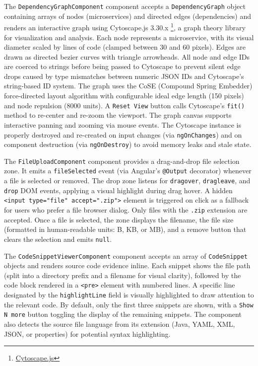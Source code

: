 \par The \texttt{DependencyGraphComponent} component accepts a \texttt{DependencyGraph} object containing arrays of nodes (microservices) and directed edges (dependencies) and renders an interactive graph using Cytoscape.js 3.30.x \footnote{\href{https://cytoscape.org/index.html}{Cytoscape.js}}, a graph theory library for visualization and analysis. Each node represents a microservice, with its visual diameter scaled by lines of code (clamped between 30 and 60 pixels). Edges are drawn as directed bezier curves with triangle arrowheads. All node and edge IDs are coerced to strings before being passed to Cytoscape to prevent silent edge drops caused by type mismatches between numeric JSON IDs and Cytoscape's string-based ID system. The graph uses the CoSE (Compound Spring Embedder) force-directed layout algorithm with configurable ideal edge length (150 pixels) and node repulsion (8000 units). A \texttt{Reset View} button calls Cytoscape's \texttt{fit()} method to re-center and re-zoom the viewport. The graph canvas supports interactive panning and zooming via mouse events. The Cytoscape instance is properly destroyed and re-created on input changes (via \texttt{ngOnChanges}) and on component destruction (via \texttt{ngOnDestroy}) to avoid memory leaks and stale state.

\par The \texttt{FileUploadComponent} component provides a drag-and-drop file selection zone. It emits a \texttt{fileSelected} event (via Angular's \texttt{@Output} decorator) whenever a file is selected or removed. The drop zone listens for \texttt{dragover}, \texttt{dragleave}, and \texttt{drop} DOM events, applying a visual highlight during drag hover. A hidden \texttt{<input type="file" accept=".zip">} element is triggered on click as a fallback for users who prefer a file browser dialog. Only files with the \texttt{.zip} extension are accepted. Once a file is selected, the zone displays the filename, the file size (formatted in human-readable units: B, KB, or MB), and a remove button that clears the selection and emits \texttt{null}.

\par The \texttt{CodeSnippetViewerComponent} component accepts an array of \texttt{CodeSnippet} objects and renders source code evidence inline. Each snippet shows the file path (split into a directory prefix and a filename for visual clarity), followed by the code block rendered in a \texttt{<pre>} element with numbered lines. A specific line designated by the \texttt{highlightLine} field is visually highlighted to draw attention to the relevant code. By default, only the first three snippets are shown, with a \texttt{Show N more} button toggling the display of the remaining snippets. The component also detects the source file language from its extension (Java, YAML, XML, JSON, or properties) for potential syntax highlighting.


